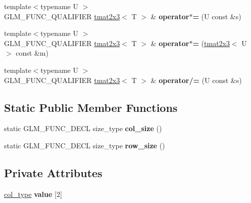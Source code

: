 \begin{DoxyCompactItemize}
\item 
\hypertarget{structglm_1_1detail_1_1tmat2x3_a6d0e3f109431cdb6d45b3d3c9ec5bd5d}{}{\footnotesize template$<$typename U $>$ }\\G\+L\+M\+\_\+\+F\+U\+N\+C\+\_\+\+Q\+U\+A\+L\+I\+F\+I\+E\+R \hyperlink{structglm_1_1detail_1_1tmat2x3}{tmat2x3}$<$ T $>$ \& {\bfseries operator$\ast$=} (U const \&s)\label{structglm_1_1detail_1_1tmat2x3_a6d0e3f109431cdb6d45b3d3c9ec5bd5d}

\item 
\hypertarget{structglm_1_1detail_1_1tmat2x3_a85f63be2f5516f0977c83e230fbb5895}{}{\footnotesize template$<$typename U $>$ }\\G\+L\+M\+\_\+\+F\+U\+N\+C\+\_\+\+Q\+U\+A\+L\+I\+F\+I\+E\+R \hyperlink{structglm_1_1detail_1_1tmat2x3}{tmat2x3}$<$ T $>$ \& {\bfseries operator$\ast$=} (\hyperlink{structglm_1_1detail_1_1tmat2x3}{tmat2x3}$<$ U $>$ const \&m)\label{structglm_1_1detail_1_1tmat2x3_a85f63be2f5516f0977c83e230fbb5895}

\item 
\hypertarget{structglm_1_1detail_1_1tmat2x3_af91dfb8d25e34223b0501064731fba2e}{}{\footnotesize template$<$typename U $>$ }\\G\+L\+M\+\_\+\+F\+U\+N\+C\+\_\+\+Q\+U\+A\+L\+I\+F\+I\+E\+R \hyperlink{structglm_1_1detail_1_1tmat2x3}{tmat2x3}$<$ T $>$ \& {\bfseries operator/=} (U const \&s)\label{structglm_1_1detail_1_1tmat2x3_af91dfb8d25e34223b0501064731fba2e}

\end{DoxyCompactItemize}
\subsection*{Static Public Member Functions}
\begin{DoxyCompactItemize}
\item 
\hypertarget{structglm_1_1detail_1_1tmat2x3_a3f255a0208ab82afbc4276085a77fd2b}{}static G\+L\+M\+\_\+\+F\+U\+N\+C\+\_\+\+D\+E\+C\+L size\+\_\+type {\bfseries col\+\_\+size} ()\label{structglm_1_1detail_1_1tmat2x3_a3f255a0208ab82afbc4276085a77fd2b}

\item 
\hypertarget{structglm_1_1detail_1_1tmat2x3_ae17c25ed3c1da3eebed1416789601e95}{}static G\+L\+M\+\_\+\+F\+U\+N\+C\+\_\+\+D\+E\+C\+L size\+\_\+type {\bfseries row\+\_\+size} ()\label{structglm_1_1detail_1_1tmat2x3_ae17c25ed3c1da3eebed1416789601e95}

\end{DoxyCompactItemize}
\subsection*{Private Attributes}
\begin{DoxyCompactItemize}
\item 
\hypertarget{structglm_1_1detail_1_1tmat2x3_afa328708728e164e3c5c2ac373a6e471}{}\hyperlink{structglm_1_1detail_1_1tvec3}{col\+\_\+type} {\bfseries value} \mbox{[}2\mbox{]}\label{structglm_1_1detail_1_1tmat2x3_afa328708728e164e3c5c2ac373a6e471}

\end{DoxyCompactItemize}


